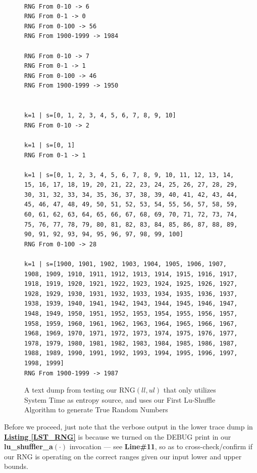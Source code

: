 \documentclass[a4paper, 18pt]{book} %
\begin{document}
\begin{figure}[H]
  \begin{center}
  \begin{lstlisting}[caption={A TESTING Our RANDOM NUMBER GENERATOR }, label={LST_RNG}, frame=single, numbers=none, basicstyle=\ttfamily,  commentstyle=\color{blue}, breaklines=true, breakatwhitespace=false]

RNG From 0-10 -> 6
RNG From 0-1 -> 0
RNG From 0-100 -> 56
RNG From 1900-1999 -> 1984

RNG From 0-10 -> 7
RNG From 0-1 -> 1
RNG From 0-100 -> 46
RNG From 1900-1999 -> 1950


k=1 | s=[0, 1, 2, 3, 4, 5, 6, 7, 8, 9, 10]
RNG From 0-10 -> 2

k=1 | s=[0, 1]
RNG From 0-1 -> 1

k=1 | s=[0, 1, 2, 3, 4, 5, 6, 7, 8, 9, 10, 11, 12, 13, 14, 15, 16, 17, 18, 19, 20, 21, 22, 23, 24, 25, 26, 27, 28, 29, 30, 31, 32, 33, 34, 35, 36, 37, 38, 39, 40, 41, 42, 43, 44, 45, 46, 47, 48, 49, 50, 51, 52, 53, 54, 55, 56, 57, 58, 59, 60, 61, 62, 63, 64, 65, 66, 67, 68, 69, 70, 71, 72, 73, 74, 75, 76, 77, 78, 79, 80, 81, 82, 83, 84, 85, 86, 87, 88, 89, 90, 91, 92, 93, 94, 95, 96, 97, 98, 99, 100]
RNG From 0-100 -> 28

k=1 | s=[1900, 1901, 1902, 1903, 1904, 1905, 1906, 1907, 1908, 1909, 1910, 1911, 1912, 1913, 1914, 1915, 1916, 1917, 1918, 1919, 1920, 1921, 1922, 1923, 1924, 1925, 1926, 1927, 1928, 1929, 1930, 1931, 1932, 1933, 1934, 1935, 1936, 1937, 1938, 1939, 1940, 1941, 1942, 1943, 1944, 1945, 1946, 1947, 1948, 1949, 1950, 1951, 1952, 1953, 1954, 1955, 1956, 1957, 1958, 1959, 1960, 1961, 1962, 1963, 1964, 1965, 1966, 1967, 1968, 1969, 1970, 1971, 1972, 1973, 1974, 1975, 1976, 1977, 1978, 1979, 1980, 1981, 1982, 1983, 1984, 1985, 1986, 1987, 1988, 1989, 1990, 1991, 1992, 1993, 1994, 1995, 1996, 1997, 1998, 1999]
RNG From 1900-1999 -> 1987

\end{lstlisting}
  \end{center}
  \caption{A text dump from testing our RNG$(ll,ul)$ that only utilizes System Time as entropy source, and uses our First Lu-Shuffle Algorithm to generate True Random Numbers}
  \label{RNGTESTDUMP}
\end{figure}

Before we proceed, just note that the verbose output in the lower trace dump in \textbf{\hyperref[LST_RNG]{Listing \ref{LST_RNG}}} is because we turned on the DEBUG print in our \textbf{lu\_shuffler\_a}$(\cdot)$ invocation --- see \textbf{Line\#11}, so as to cross-check/confirm if our RNG is operating on the correct ranges given our input lower and upper bounds.
\end{document}
